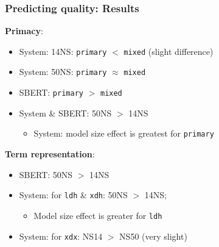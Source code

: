 \documentclass[xcolor={dvipsnames}]{beamer}
\newcommand{\param}[1]{\texttt{#1}}
\begin{document}
\begin{frame}
\frametitle{Predicting quality: Results}

\vspace{-.5em}

\pause
\textbf{Primacy}:
\begin{itemize}
\pause
\item System: 14NS: \param{primary} $<$ \param{mixed} (slight difference)
\pause
\item System: 50NS: \param{primary} $\approx$ \param{mixed}
\pause
\item SBERT: \param{primary} $>$ \param{mixed}
\pause
\item System \& SBERT: 50NS $>$ 14NS
\begin{itemize}
\pause
\item System: model size effect is greatest for \param{primary}
\end{itemize}
\end{itemize}

\vspace{1em}

\pause
\textbf{Term representation}:
\begin{itemize}
\pause
\item SBERT: 50NS $>$ 14NS
\pause
\item System: for \param{ldh} \& \param{xdh}: 50NS $>$ 14NS;
\begin{itemize}
\pause
\item Model size effect is greater for \param{ldh}
\end{itemize}
\pause
\item System: for \param{xdx}: NS14 $>$ NS50 (very slight)
\end{itemize}

\end{frame}
\end{document}
